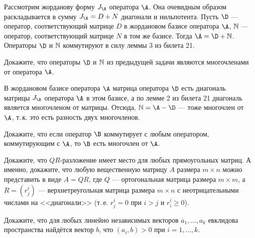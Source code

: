 \begin{solution}
    Рассмотрим жорданову форму $J_\A$ оператора $\A$. Она очевидным образом раскладывается в сумму $J_\A = D + N$ диагонали и нильпотента. Пусть $\D$ --- оператор, соответствующий матрице $D$ в жордановом базисе оператора $\A$, $\N$ --- оператор, соответствующий матрице $N$ в том же базисе. Тогда $\A = \D + \N$. Операторы $\D$ и $\N$ коммутируют в силу леммы 3 из билета 21.
\end{solution}

\begin{problem}
    Докажите, что операторы $\D$ и $\N$ из предыдущей задачи являются многочленами от оператора $\A$.
\end{problem}

\begin{solution}
    В жордановом базисе оператора $\A$ матрица оператора $\D$ есть диагональ матрицы $J_\A$ оператора $\A$ в этом базисе, а по лемме 2 из билета 21 диагональ является многочленом от матрицы. Отсюда, $\N = \A - \D$ --- тоже многочлен от $\A$, т.\,к. это есть разность двух многочленов.
\end{solution}

\renewcommand{\N}{\mathbb{N}}

\begin{problem}
    Докажите, что если оператор $\B$ коммутирует с любым оператором, коммутирующим с $\A$, то $\B$ есть многочлен от $\A$.
\end{problem}

\begin{solution}
\end{solution}

\begin{problem}
    Докажите, что $QR$-разложение имеет место для любых прямоугольных матриц. А именно, докажите, что любую вещественную матрицу $A$ размера $m \times n$ можно представить в виде $A = QR$, где $Q$ --- ортогональная матрица размера $m \times m$, а $R = (r^i_j)$ --- верхнетреугольная матрица размера $m \times n$ с неотрицательными числами на <<диагонали>> (т.\,е. $r^i_j = 0$ при $i > j$ и $r^i_i \geqslant 0$).
\end{problem}

\begin{problem}
    Докажите, что для любых линейно независимых векторов $a_1, \ldots, a_k$ евклидова пространства найдётся вектор $b$, что $(a_i, b) > 0$ при $i = 1, \ldots, k$.
\end{problem}

